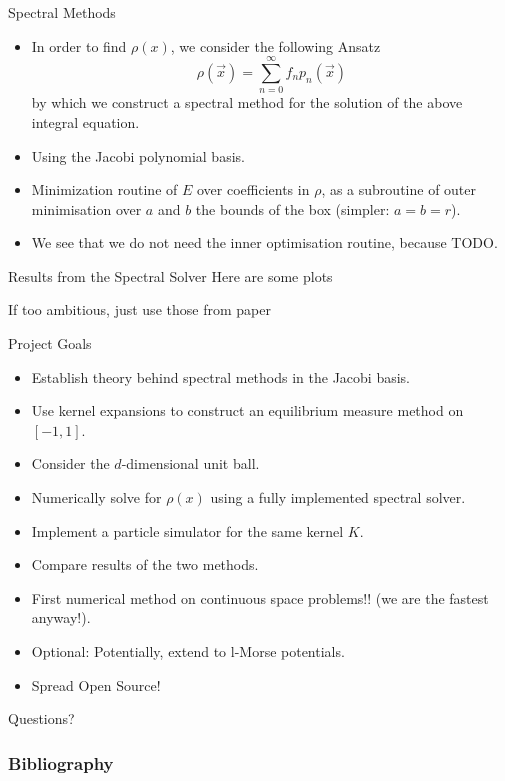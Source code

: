 \documentclass[aspectratio=169,hyperref={colorlinks=true}]{beamer}
\begin{document}
  \begin{frame}{Spectral Methods}
    \begin{itemize}
      \item In order to find $\rho(x)$, we consider the following Ansatz
            $$\rho(\vec{x}) = \sum_{n=0}^{\infty} f_n p_n(\vec{x})$$
            by which we construct a spectral method for the solution of the above integral equation.
      \item Using the Jacobi polynomial basis.
      \item Minimization routine of $E$ over coefficients in $\rho$, as a subroutine of outer minimisation over $a$ and $b$ the bounds of the box (simpler: $a = b = r$).
      \item We see that we do not need the inner optimisation routine, because TODO.
    \end{itemize}
  \end{frame}

  \begin{frame}{Results from the Spectral Solver}
    Here are some plots

    If too ambitious, just use those from paper
  \end{frame}

  \begin{frame}{Project Goals}
    \begin{itemize}
      \item Establish theory behind spectral methods in the Jacobi basis.
      \item Use kernel expansions to construct an equilibrium measure method on $[-1, 1]$.
      \item Consider the $d$-dimensional unit ball.
      \item Numerically solve for $\rho(x)$ using a fully implemented spectral solver.
      \item Implement a particle simulator for the same kernel $K$.
      \item Compare results of the two methods.
      \item First numerical method on continuous space problems!! (we are the fastest anyway!).
      \item Optional: Potentially, extend to l-Morse potentials.
      \item Spread Open Source!
    \end{itemize}
  \end{frame}

  \begin{frame}{}
    Questions?
  \end{frame}

  \begin{frame}[allowframebreaks]
    \frametitle{Bibliography}
    \nocite{*}
    \printbibliography[heading=bibnumbered]
  \end{frame}
\end{document}
